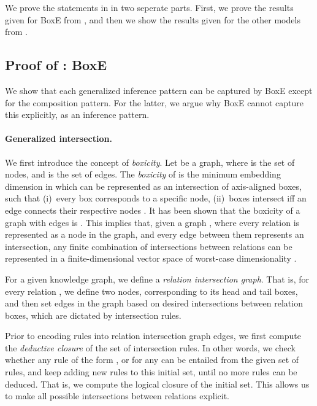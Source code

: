 \documentclass{article}
\begin{document}
We prove the statements in  in two seperate parts. First, we prove the results given for BoxE from , and then we show the results given for the other models from .

\subsection{Proof of : BoxE}
\label{app:genInfProof}

We show that each generalized inference pattern can be captured by BoxE except for the composition pattern. For the latter, we argue why BoxE cannot capture this explicitly, as an inference pattern.

\paragraph{Generalized intersection.} We first introduce the concept of \emph{boxicity}. Let  be a graph, where  is the set of nodes, and  is the set of edges. The \emph{boxicity} of  is the minimum embedding dimension in which  can be represented as an intersection of axis-aligned boxes, such that 
(i)~every box corresponds to a specific node, 
(ii)~boxes intersect iff an edge connects their respective nodes \cite{Roberts68}. 
It has been shown that the boxicity of a graph with  edges is  \cite{Chandran08}. This implies that, given a graph , where every relation  is represented as a node in the graph, and every edge between them represents an intersection,
any finite combination of intersections between relations can be represented in a finite-dimensional vector space of worst-case dimensionality . 

For a given knowledge graph, we define a \emph{relation intersection graph}. That is, for every relation , we define two nodes,  corresponding to its head and tail boxes, and then set edges in the graph based on desired intersections between relation boxes, which are dictated by intersection rules. 

Prior to encoding rules into relation intersection graph edges, we first compute the \emph{deductive closure} of the set of intersection rules. In other words, we check whether any rule of the form , or  for any  can be entailed from the given set of rules, and keep adding new rules to this initial set, until no more rules can be deduced. That is, we compute the logical closure of the initial set. This allows us to make all possible intersections between relations explicit.
\end{document}

